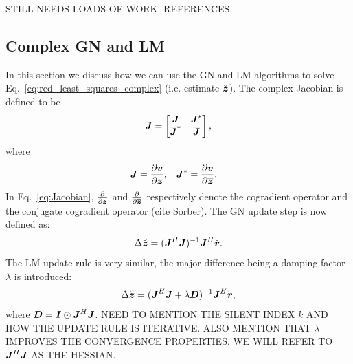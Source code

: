 \documentclass[useAMS,usenatbib]{mn2e}
\newcommand{\bz}{\bmath{z}}
\newcommand{\br}{\bmath{r}}
\newcommand{\bv}{\bmath{v}}
\newcommand{\bJ}{\bmath{J}}
\newcommand{\bD}{\bmath{D}}
\newcommand{\bI}{\bmath{I}}
\newcommand{\conj}[1]{\overline{#1}}
\begin{document}
STILL NEEDS LOADS OF WORK. REFERENCES.

\subsection{Complex GN and LM}
In this section we discuss how we can use the GN and LM algorithms to solve Eq.~\eqref{eq:red_least_squares_complex} (i.e. estimate $\breve{\bz}$). The complex Jacobian is defined to be
\begin{equation}
\label{eq:Jacobian}
\bJ = \begin{bmatrix}
       \bJ & \bJ^*\\
       \conj{\bJ}^* & \conj{\bJ} 
      \end{bmatrix},
\end{equation}
where 
\begin{align}
\bJ &= \frac{\partial \bv}{\partial \bz}, & \bJ^* &= \frac{\partial \bv}{\partial \conj{\bz}}. 
\end{align}
In Eq.~\eqref{eq:Jacobian}, $\frac{\partial}{\partial \bz}$ and $\frac{\partial}{\partial \conj{\bz}}$ respectively denote the cogradient operator and the conjugate cogradient operator (cite Sorber).
The GN update step is now defined as:
\begin{equation}
\label{eq:GN_update}
 \Delta \breve{\bz} = (\bJ^H\bJ)^{-1}\bJ^H\breve{\br}.
\end{equation}
The LM update rule is very similar, the major difference being a damping factor $\lambda$ is introduced:
\begin{equation}
\label{eq:LM_update}
\Delta \breve{\bz} = (\bJ^H\bJ + \lambda\bD)^{-1}\bJ^H\breve{\br},
\end{equation}
where $\bD=\bI\odot\bJ^H\bJ$. 
NEED TO MENTION THE SILENT INDEX $k$ AND HOW THE UPDATE RULE IS ITERATIVE. ALSO MENTION THAT $\lambda$ IMPROVES THE CONVERGENCE PROPERTIES. WE WILL REFER TO $\bJ^H\bJ$ AS THE 
HESSIAN.
\end{document}
